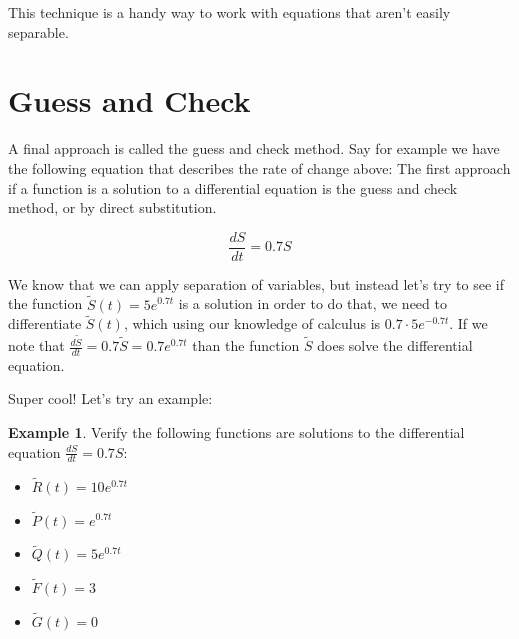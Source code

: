 \documentclass[
]{book}
\providecommand{\tightlist}{%
  \setlength{\itemsep}{0pt}\setlength{\parskip}{0pt}}
\theoremstyle{definition}
\theoremstyle{definition}
\newtheorem{example}{Example}[chapter]
\theoremstyle{definition}
\theoremstyle{remark}
\begin{document}
This technique is a handy way to work with equations that aren't easily separable.

\hypertarget{guess-and-check}{%
\section{Guess and Check}\label{guess-and-check}}

A final approach is called the guess and check method. Say for example we have the following equation that describes the rate of change above: The first approach if a function is a solution to a differential equation is the guess and check method, or by direct substitution.

\[ \frac{dS}{dt} = 0.7 S \]

We know that we can apply separation of variables, but instead let's try to see if the function \(\tilde{S}(t) = 5 e^{0.7t}\) is a solution in order to do that, we need to differentiate \(\tilde{S}(t)\), which using our knowledge of calculus is \(0.7 \cdot 5 e^{-0.7t}\). If we note that \(\displaystyle \frac{d\tilde{S}}{dt} = 0.7 \tilde{S} = 0.7 e^{0.7t}\) than the function \(\tilde{S}\) does solve the differential equation.

Super cool! Let's try an example:

\begin{example}
\protect\hypertarget{exm:unnamed-chunk-114}{}{\label{exm:unnamed-chunk-114} }Verify the following functions are solutions to the differential equation \(\displaystyle \frac{dS}{dt} = 0.7 S\):

\begin{itemize}
\tightlist
\item
  \(\tilde{R}(t) = 10e^{0.7t}\)
\item
  \(\tilde{P}(t) = e^{0.7t}\)
\item
  \(\tilde{Q}(t) = 5e^{0.7t}\)
\item
  \(\tilde{F}(t)=3\)
\item
  \(\tilde{G}(t)=0\)
\end{itemize}
\end{example}
\end{document}
